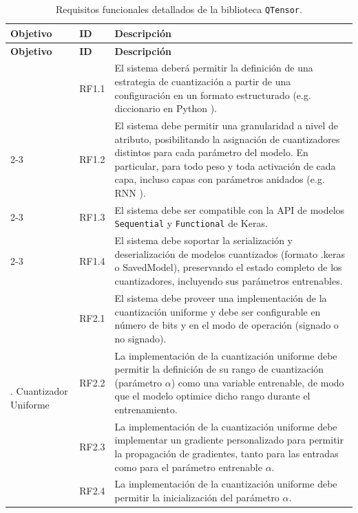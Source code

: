 \begin{longtable}{m{2.0cm} m{1.5cm} m{8.5cm}}

\caption{Requisitos funcionales detallados de la biblioteca \texttt{QTensor}.}
\label{tab:rf_detailed}\\
\toprule
\textbf{Objetivo} & \textbf{ID} & \textbf{Descripción} \\
\midrule
\endfirsthead

\toprule
\textbf{Objetivo} & \textbf{ID} & \textbf{Descripción} \\
\midrule
\endhead
\bottomrule
\endfoot

\multirow[c]{4}{2.0cm}{\centering 1. Diseño y API}
    & RF1.1 & El sistema deberá permitir la definición de una estrategia de cuantización a partir de una configuración en un formato estructurado (e.g. diccionario en Python \cite{python_dictionaries}). \\
    \cmidrule{2-3}
    & RF1.2 & El sistema debe permitir una granularidad a nivel de atributo, posibilitando la asignación de cuantizadores distintos para cada parámetro del modelo. En particular, para todo peso y toda activación de cada capa, incluso capas con parámetros anidados (e.g. RNN \cite{tensorflow_keras_rnn}). \\
    \cmidrule{2-3}
    & RF1.3 & El sistema debe ser compatible con la API de modelos \texttt{Sequential} \cite{tensorflow_keras_sequential_api} y \texttt{Functional} \cite{tensorflow_keras_functional_api} de Keras. \\
    \cmidrule{2-3}
    & RF1.4 & El sistema debe soportar la serialización y deserialización \cite{tensorflow_serialization_guide} de modelos cuantizados (formato .keras o SavedModel), preservando el estado completo de los cuantizadores, incluyendo sus parámetros entrenables. \\
\midrule

\multirow[c]{4}{2.0cm}{\centering 2. Cuantizador Uniforme}
    & RF2.1 & El sistema debe proveer una implementación de la cuantización uniforme y debe ser configurable en número de bits y en el modo de operación (signado o no signado). \\
    \cmidrule{2-3}
    & RF2.2 & La implementación de la cuantización uniforme debe permitir la definición de su rango de cuantización (parámetro $\alpha$) como una variable entrenable, de modo que el modelo optimice dicho rango durante el entrenamiento. \\
    \cmidrule{2-3}
    & RF2.3 & La implementación de la cuantización uniforme debe implementar un gradiente personalizado para permitir la propagación de gradientes, tanto para las entradas como para el parámetro entrenable $\alpha$. \\
    \cmidrule{2-3}
    & RF2.4 & La implementación de la cuantización uniforme debe permitir la inicialización del parámetro $\alpha$. \\
\midrule


\end{longtable}
